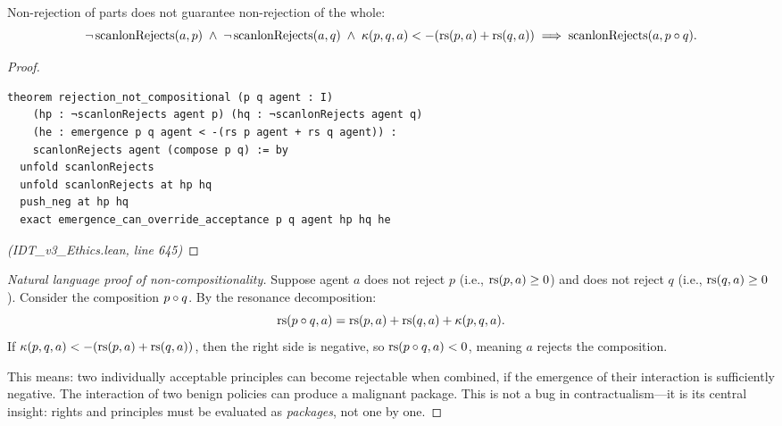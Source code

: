 \begin{theorem}
\label{thm:rejection-not-compositional}
Non-rejection of parts does not guarantee non-rejection of the whole:
\[
  \neg\, \mathrm{scanlonRejects}(a, p) \;\wedge\;
  \neg\, \mathrm{scanlonRejects}(a, q) \;\wedge\;
  \kappa(p, q, a) < -(\mathrm{rs}(p, a) + \mathrm{rs}(q, a))
  \implies \mathrm{scanlonRejects}(a, p \circ q).
\]
\end{theorem}

\begin{proof}
\begin{lstlisting}
theorem rejection_not_compositional (p q agent : I)
    (hp : ¬scanlonRejects agent p) (hq : ¬scanlonRejects agent q)
    (he : emergence p q agent < -(rs p agent + rs q agent)) :
    scanlonRejects agent (compose p q) := by
  unfold scanlonRejects
  unfold scanlonRejects at hp hq
  push_neg at hp hq
  exact emergence_can_override_acceptance p q agent hp hq he
\end{lstlisting}
\textit{(IDT\_v3\_Ethics.lean, line 645)}
\end{proof}

\begin{proof}[Natural language proof of non-compositionality]
Suppose agent $a$ does not reject $p$ (i.e., $\mathrm{rs}(p, a) \geq 0$) and does
not reject $q$ (i.e., $\mathrm{rs}(q, a) \geq 0$). Consider the composition
$p \circ q$. By the resonance decomposition:
\[
  \mathrm{rs}(p \circ q, a) = \mathrm{rs}(p, a) + \mathrm{rs}(q, a) + \kappa(p, q, a).
\]
If $\kappa(p, q, a) < -(\mathrm{rs}(p, a) + \mathrm{rs}(q, a))$, then the right side is
negative, so $\mathrm{rs}(p \circ q, a) < 0$, meaning $a$ rejects the composition.

This means: two individually acceptable principles can become rejectable
when combined, if the emergence of their interaction is sufficiently
negative. The interaction of two benign policies can produce a malignant
package. This is not a bug in contractualism---it is its central insight:
rights and principles must be evaluated as \emph{packages}, not one by one.
\end{proof}

